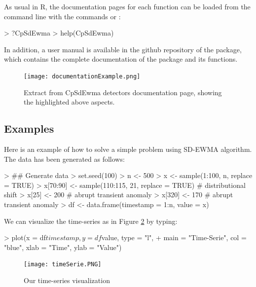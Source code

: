\documentclass[a4paper]{article}
\begin{document}
As usual in R, the documentation pages for each function can be loaded from the command line with the commands  or :

\begin{Schunk}
\begin{Sinput}
> ?CpSdEwma
> help(CpSdEwma)
\end{Sinput}
\end{Schunk}

In addition, a user manual is available in the github repository of the   package, which contains the complete documentation of the package and its functions.

\begin{figure}[htbp]
\centering
\texttt{[image: documentationExample.png]}
\caption{Extract from CpSdEwma detectors documentation page, showing the highlighted above aspects.}
\label{fig:documentation}
\end{figure}

\newpage

\subsection{Examples}\label{sec:examples}

Here is an example of how to solve a simple problem using SD-EWMA algorithm. The data has been generated as follows:

\begin{Schunk}
\begin{Sinput}
> ## Generate data
> set.seed(100)
> n <- 500
> x <- sample(1:100, n, replace = TRUE)
> x[70:90] <- sample(110:115, 21, replace = TRUE) # distributional shift
> x[25] <- 200 # abrupt transient anomaly
> x[320] <- 170 # abrupt transient anomaly
> df <- data.frame(timestamp = 1:n, value = x)
\end{Sinput}
\end{Schunk}

We can visualize the time-series as in Figure \ref{fig:ts} by typing:
\begin{Schunk}
\begin{Sinput}
> plot(x = df$timestamp, y = df$value, type = "l",
+      main = "Time-Serie", col = "blue", xlab = "Time", ylab = "Value")
\end{Sinput}
\end{Schunk}

\begin{figure}[htbp]
\centering
\texttt{[image: timeSerie.PNG]}
\caption{Our time-series visualization}
\label{fig:ts}
\end{figure}
\end{document}
